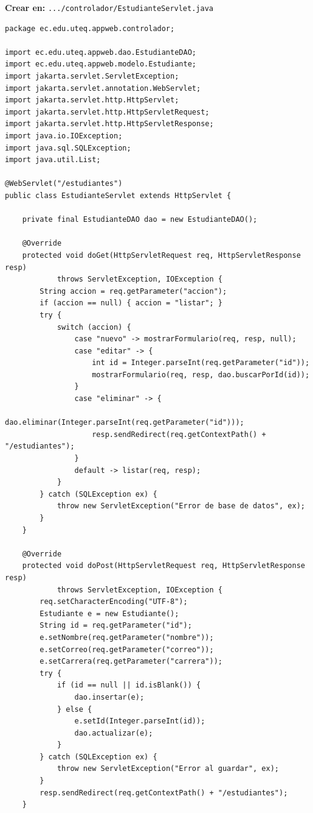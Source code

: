 \documentclass[11pt,a4paper,openany]{book}
\begin{document}
{\small\textbf{Crear en:} \texttt{.../controlador/EstudianteServlet.java}}
\begin{lstlisting}[style=java,caption={EstudianteServlet.java (control de la peticion)},label={lst:jsp-servlet}]
package ec.edu.uteq.appweb.controlador;

import ec.edu.uteq.appweb.dao.EstudianteDAO;
import ec.edu.uteq.appweb.modelo.Estudiante;
import jakarta.servlet.ServletException;
import jakarta.servlet.annotation.WebServlet;
import jakarta.servlet.http.HttpServlet;
import jakarta.servlet.http.HttpServletRequest;
import jakarta.servlet.http.HttpServletResponse;
import java.io.IOException;
import java.sql.SQLException;
import java.util.List;

@WebServlet("/estudiantes")
public class EstudianteServlet extends HttpServlet {

    private final EstudianteDAO dao = new EstudianteDAO();

    @Override
    protected void doGet(HttpServletRequest req, HttpServletResponse resp)
            throws ServletException, IOException {
        String accion = req.getParameter("accion");
        if (accion == null) { accion = "listar"; }
        try {
            switch (accion) {
                case "nuevo" -> mostrarFormulario(req, resp, null);
                case "editar" -> {
                    int id = Integer.parseInt(req.getParameter("id"));
                    mostrarFormulario(req, resp, dao.buscarPorId(id));
                }
                case "eliminar" -> {
                    dao.eliminar(Integer.parseInt(req.getParameter("id")));
                    resp.sendRedirect(req.getContextPath() + "/estudiantes");
                }
                default -> listar(req, resp);
            }
        } catch (SQLException ex) {
            throw new ServletException("Error de base de datos", ex);
        }
    }

    @Override
    protected void doPost(HttpServletRequest req, HttpServletResponse resp)
            throws ServletException, IOException {
        req.setCharacterEncoding("UTF-8");
        Estudiante e = new Estudiante();
        String id = req.getParameter("id");
        e.setNombre(req.getParameter("nombre"));
        e.setCorreo(req.getParameter("correo"));
        e.setCarrera(req.getParameter("carrera"));
        try {
            if (id == null || id.isBlank()) {
                dao.insertar(e);
            } else {
                e.setId(Integer.parseInt(id));
                dao.actualizar(e);
            }
        } catch (SQLException ex) {
            throw new ServletException("Error al guardar", ex);
        }
        resp.sendRedirect(req.getContextPath() + "/estudiantes");
    }


\end{lstlisting}
\end{document}
